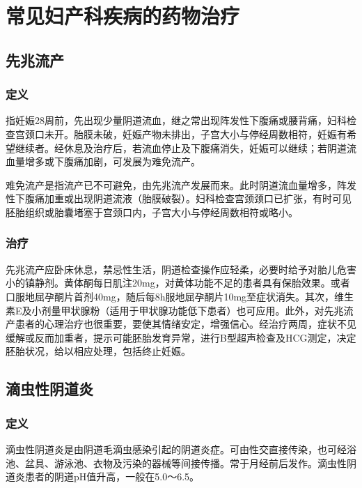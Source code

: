 \chapter{常见妇产科疾病的药物治疗}

\section{先兆流产}

\subsection{定义}

指妊娠28周前，先出现少量阴道流血，继之常出现阵发性下腹痛或腰背痛，妇科检查宫颈口未开。胎膜未破，妊娠产物未排出，子宫大小与停经周数相符，妊娠有希望继续者。经休息及治疗后，若流血停止及下腹痛消失，妊娠可以继续；若阴道流血量增多或下腹痛加剧，可发展为难免流产。

难免流产是指流产已不可避免，由先兆流产发展而来。此时阴道流血量增多，阵发性下腹痛加重或出现阴道流液（胎膜破裂）。妇科检查宫颈颈口已扩张，有时可见胚胎组织或胎囊堵塞于宫颈口内，子宫大小与停经周数相符或略小。

\subsection{治疗}

先兆流产应卧床休息，禁忌性生活，阴道检查操作应轻柔，必要时给予对胎儿危害小的镇静剂。黄体酮每日肌注20mg，对黄体功能不足的患者具有保胎效果。或者口服地屈孕酮片首剂40mg，随后每8h服地屈孕酮片10mg至症状消失。其次，维生素E及小剂量甲状腺粉（适用于甲状腺功能低下患者）也可应用。此外，对先兆流产患者的心理治疗也很重要，要使其情绪安定，增强信心。经治疗两周，症状不见缓解或反而加重者，提示可能胚胎发育异常，进行B型超声检查及HCG测定，决定胚胎状况，给以相应处理，包括终止妊娠。

\section{滴虫性阴道炎}

\subsection{定义}

滴虫性阴道炎是由阴道毛滴虫感染引起的阴道炎症。可由性交直接传染，也可经浴池、盆具、游泳池、衣物及污染的器械等间接传播。常于月经前后发作。滴虫性阴道炎患者的阴道pH值升高，一般在5.0～6.5。

